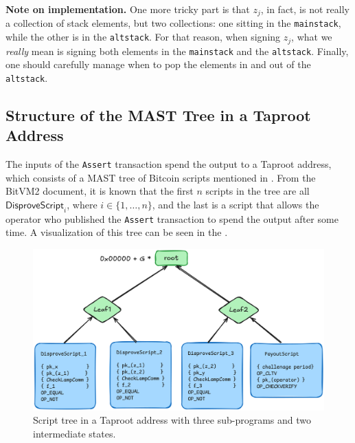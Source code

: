 \documentclass{iacrtrans}
\begin{document}
\textbf{Note on implementation.} One more tricky part is that $z_j$, in fact, is not really a collection of stack elements, but two collections: one sitting in the \texttt{mainstack}, while the other is in the \texttt{altstack}. For that reason, when signing $z_j$, what we \textit{really} mean is signing both elements in the \texttt{mainstack} and the \texttt{altstack}. Finally, one should carefully manage when to pop the elements in and out of the \texttt{altstack}.

\subsection{Structure of the MAST Tree in a Taproot
Address}\label{sec:mast-tree-structure}

The inputs of the \texttt{Assert} transaction spend the output to a
Taproot address, which consists of a MAST tree of Bitcoin scripts
mentioned in . From the BitVM2 document, it
is known that the first \(n\) scripts in the tree are all
\(\mathsf{DisproveScript}_i\), where \(i \in \{1,\dots, n\}\), and the last is a
script that allows the operator who published the \texttt{Assert}
transaction to spend the output after some time. A visualization of
this tree can be seen in the .

\begin{figure}[h]
  \centering
  \includegraphics[width=.65\linewidth]{../images/assert-tx-taproot-output.png}
  \caption{\label{fig:assert-tx-mast-tree}Script tree in a Taproot
  address with three sub-programs and two intermediate states.}
\end{figure}
\end{document}
